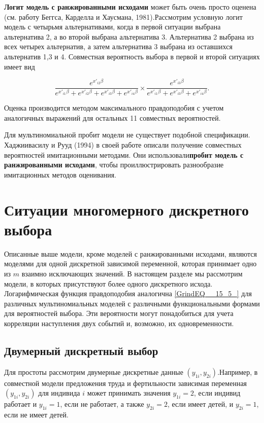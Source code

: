 \textbf{Логит модель с ранжированными исходами} может быть очень просто оценена (см. работу Беггса, Карделла и Хаусмана, 1981).Рассмотрим условную логит модель с четырьмя альтернативами, когда в первой ситуации выбрана альтернатива 2, а во второй выбрана альтернатива 3. Альтернатива 2 выбрана из всех четырех альтернатив, а затем альтернатива 3 выбрана из оставшихся альтернатив 1,3 и 4. Совместная вероятность выбора в первой и второй ситуациях имеет вид\textbf{}

\[\frac{e^{x'_{i2}\beta }}{e^{x'_{i1}\beta }+e^{x'_{i2}\beta }+e^{x'_{i3}\beta }+e^{x'_{i4}\beta }}\times \frac{e^{x'_{i3}\beta }}{e^{x'_{i1}\beta }+e^{x'_{i3}\beta }+e^{x'_{i4}\beta }}.\] 

Оценка производится методом максимального правдоподобия с учетом аналогичных выражений для остальных 11 совместных вероятностей.

Для мультиномиальной пробит модели не существует подобной спецификации. Хаджиивасилу и Рууд          (1994) в своей работе описали получение совместных вероятностей имитационными методами. Они использовали\textbf{пробит модель с ранжированными исходами}, чтобы проиллюстрировать разнообразие имитационных методов оценивания.

\section{Ситуации многомерного дискретного выбора}

Описанные выше модели, кроме моделей с ранжированными исходами, являются моделями для одной дискретной зависимой переменной, которая принимает одно из $m$ взаимно исключающих значений. В настоящем разделе мы рассмотрим модели, в которых присутствуют более одного дискретного исхода. Логарифмическая функция правдоподобия аналогична \eqref{GrindEQ__15_5_} для различных мультиномиальных моделей с различными функциональными формами для вероятностей выбора. Эти вероятности могут понадобиться для учета корреляции наступления двух событий и, возможно, их одновременности.

\subsection{ Двумерный дискретный выбор}

Для простоты рассмотрим двумерные дискретные данные $(y_{1i},y_{2i})$.Например, в совместной модели предложения труда и фертильности зависимая переменная $(y_{1i},y_{2i})$ для индивида $i$ может принимать значения $y_{1i}=2$, если индивид работает и $y_{1i}=1$, если не работает, а также $y_{2i}=2$, если имеет детей, и $y_{2i}=1$, если не имеет детей.

